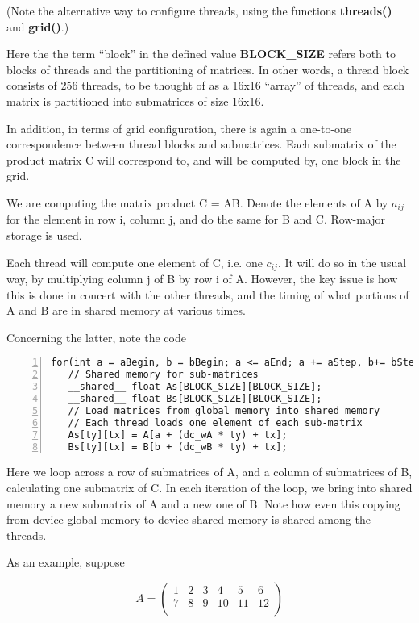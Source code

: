 (Note the alternative way to configure threads, using the functions {\bf
threads()} and {\bf grid()}.)

Here the the term ``block'' in the defined value {\bf BLOCK\_SIZE}
refers both to blocks of threads and the partitioning of matrices.
In other words, a thread block consists of 256 threads, to be thought of
as a 16x16 ``array'' of threads, and each matrix is partitioned into
submatrices of size 16x16.

In addition, in terms of grid configuration, there is again a one-to-one
correspondence between thread blocks and submatrices.  Each submatrix of
the product matrix C will correspond to, and will be computed by, one
block in the grid.

We are computing the matrix product C = AB.  Denote the elements of A by
$a_{ij}$ for the element in row i, column j, and do the same for B and
C.  Row-major storage is used.

Each thread will compute one element of C, i.e. one $c_{ij}$.  It will
do so in the usual way, by multiplying column j of B by row i of A.
However, the key issue is how this is done in concert with the other
threads, and the timing of what portions of A and B are in shared memory
at various times.  

Concerning the latter, note the code

\begin{lstlisting}[numbers=left]
for(int a = aBegin, b = bBegin; a <= aEnd; a += aStep, b+= bStep) {
   // Shared memory for sub-matrices
   __shared__ float As[BLOCK_SIZE][BLOCK_SIZE];
   __shared__ float Bs[BLOCK_SIZE][BLOCK_SIZE];
   // Load matrices from global memory into shared memory
   // Each thread loads one element of each sub-matrix
   As[ty][tx] = A[a + (dc_wA * ty) + tx];
   Bs[ty][tx] = B[b + (dc_wB * ty) + tx];
\end{lstlisting}

Here we loop across a row of submatrices of A, and a column of
submatrices of B, calculating one submatrix of C.  In each iteration of
the loop, we bring into shared memory a new submatrix of A and a new one
of B.  Note how even this copying from device global memory to device
shared memory is shared among the threads.  

As an example, suppose

\begin{equation}
A =
\left (
\begin{array}{cccccc}
1 & 2 & 3 & 4 & 5 & 6 \\
7 & 8 & 9 & 10 & 11 & 12 \\
\end{array}
\right ) 
\end{equation}

